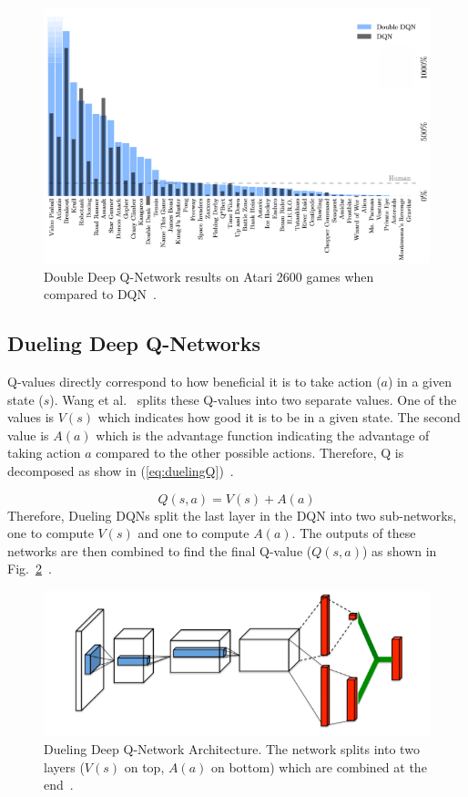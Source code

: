 \documentclass[12pt,american]{report}
\begin{document}
\begin{figure}
\centering
\includegraphics[scale=.5]{images/ddqn-results.png}
\caption{Double Deep Q-Network results on Atari 2600 games when compared to DQN~\cite{van2016deep}.}
\label{fig:ddqn-results}
\end{figure}

\subsection{Dueling Deep Q-Networks}
\label{sec:DuelingDQN}
Q-values directly correspond to how beneficial it is to take action ($a$) in a given state ($s$). Wang et al.~\cite{wang2015dueling} splits these Q-values into two separate values.  One of the values is $V(s)$ which indicates how good it is to be in a given state. The second value is $A(a)$ which is the advantage function indicating the advantage of taking action $a$ compared to the other possible actions.  Therefore, Q is decomposed as show in (\ref{eq:duelingQ})~\cite{wang2015dueling}.

\begin{equation}
          \label{eq:duelingQ}
          Q(s,a) = V(s) + A(a)%
\end{equation}
Therefore, Dueling DQNs split the last layer in the DQN into two sub-networks, one to compute $V(s)$ and one to compute $A(a)$.  The outputs of these networks are then combined to find the final Q-value ($Q(s,a)$) as shown in Fig.~\ref{fig:duelingDQN}~\cite{wang2015dueling}.

\begin{figure}
\centering
\includegraphics[scale=1]{images/duelingDQN.png}
\caption{Dueling Deep Q-Network Architecture. The network splits into two layers ($V(s)$ on top, $A(a)$ on bottom) which are combined at the end~\cite{wang2015dueling}.}
\label{fig:duelingDQN}
\end{figure}
\end{document}

